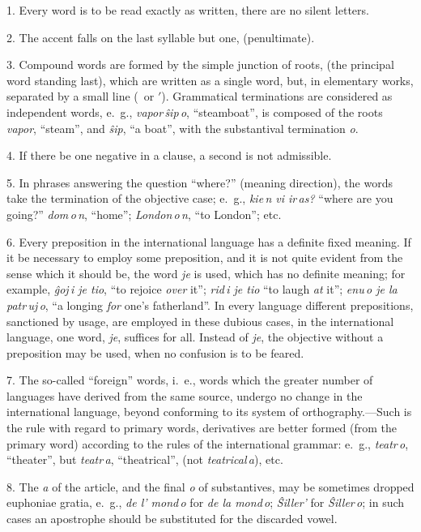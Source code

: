 \documentclass[12pt,twoside]{book}
\begin{document}
1. Every word is to be read exactly as written, there are no silent letters.

2. The accent falls on the last syllable but one, (penultimate).

3. Compound words are formed by the simple junction of roots, (the principal word standing last), which are written as a single word, but, in elementary works, separated by a small line (\, or {$'$}). Grammatical terminations are considered as independent words, e.~g., \emph{vapor\,ŝip\,o}, “steamboat”, is composed of the roots \emph{vapor}, “steam”, and \emph{ŝip}, “a boat”, with the substantival termination \emph{o}.

4. If there be one negative in a clause, a second is not admissible.

5. In phrases answering the question “where?” (meaning direction), the words take the termination of the objective case; e.~g., \emph{kie\,n vi ir\,as?} “where are you going?” \emph{dom\,o\,n}, “home”; \emph{London\,o\,n}, “to London”; etc.

6. Every preposition in the international language has a definite fixed meaning. If it be necessary to employ some preposition, and it is not quite evident from the sense which it should be, the word \emph{je} is used, which has no definite meaning; for example, \emph{ĝoj\,i je tio}, “to rejoice \emph{over} it”; \emph{rid\,i je tio} “to laugh \emph{at} it”; \emph{enu\,o je la patr\,uj\,o}, “a longing \emph{for} one’s fatherland”. In every language different prepositions, sanctioned by usage, are employed in these dubious cases, in the international language, one word, \emph{je}, suffices for all. Instead of \emph{je}, the objective without a preposition may be used, when no confusion is to be feared.

7. The so-called “foreign” words, i.~e., words which the greater number of languages have derived from the same source, undergo no change in the international language, beyond conforming to its system of orthography.---Such is the rule with regard to primary words, derivatives are better formed (from the primary word) according to the rules of the international grammar: e.~g., \emph{teatr\,o}, “theater”, but \emph{teatr\,a}, “theatrical”, (not \emph{teatrical\,a}), etc.

8. The \emph{a} of the article, and the final \emph{o} of substantives, may be sometimes dropped euphoniae gratia, e.~g., \emph{de l’ mond\,o} for \emph{de la mond\,o}; \emph{Ŝiller’} for \emph{Ŝiller\,o}; in such cases an apostrophe should be substituted for the discarded vowel. 
\end{document}
